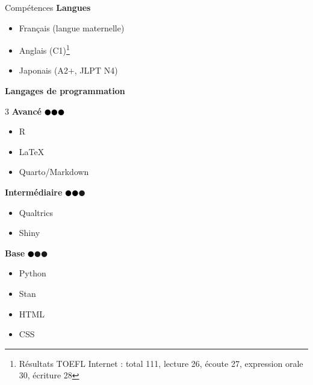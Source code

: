 \documentclass{resume} %
\begin{document}
\begin{rSection}{Compétences}
	{\bf Langues}
	\begin{itemize}
		\item[-] Français (langue maternelle)
		\item[-] Anglais (C1)\footnote{Résultats TOEFL Internet : total 111, lecture 26, écoute 27, expression orale 30, écriture 28}
		\item[-] Japonais (A2+, JLPT N4)
	\end{itemize}

	\vspace{0.5cm}

	{\bf Langages de programmation}
	\begin{multicols}{3}
		\textbf{Avancé} \textcolor{black}{$\CIRCLE\CIRCLE\CIRCLE$}
		\begin{itemize}
			\item[-] R
			\item[-] \LaTeX
			\item[-] Quarto/Markdown
		\end{itemize}
		\columnbreak
		\textbf{Intermédiaire} \textcolor{black}{$\CIRCLE\CIRCLE$}\textcolor{gray!60}{$\CIRCLE$}
		\begin{itemize}
			\item[-] Qualtrics
			\item[-] Shiny
		\end{itemize}
		\columnbreak
		\textbf{Base} \textcolor{black}{$\CIRCLE$}\textcolor{gray!60}{$\CIRCLE\CIRCLE$}
		\begin{itemize}
			\item[-] Python
			\item[-] Stan
			\item[-] HTML
			\item[-] CSS
		\end{itemize}
	\end{multicols}

\end{rSection}
\end{document}
